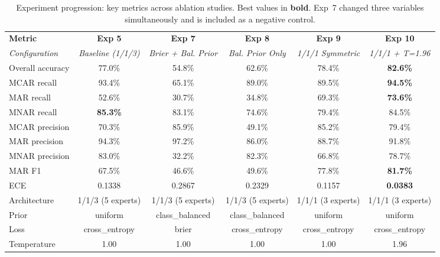 \begin{table}[htbp]
\centering
\caption{Experiment progression: key metrics across ablation studies. Best values in \textbf{bold}. Exp~7 changed three variables simultaneously and is included as a negative control.}
\label{tab:experiment-progression}
\small
\begin{tabular}{lccccc}
\toprule
\textbf{Metric} & \textbf{Exp 5} & \textbf{Exp 7} & \textbf{Exp 8} & \textbf{Exp 9} & \textbf{Exp 10} \\
\textit{Configuration} & \textit{Baseline (1/1/3)} & \textit{Brier + Bal. Prior} & \textit{Bal. Prior Only} & \textit{1/1/1 Symmetric} & \textit{1/1/1 + T=1.96} \\
\midrule
Overall accuracy & 77.0\% & 54.8\% & 62.6\% & 78.4\% & \textbf{82.6\%} \\
MCAR recall & 93.4\% & 65.1\% & 89.0\% & 89.5\% & \textbf{94.5\%} \\
MAR recall & 52.6\% & 30.7\% & 34.8\% & 69.3\% & \textbf{73.6\%} \\
MNAR recall & \textbf{85.3\%} & 83.1\% & 74.6\% & 79.4\% & 84.5\% \\
MCAR precision & 70.3\% & 85.9\% & 49.1\% & 85.2\% & 79.4\% \\
MAR precision & 94.3\% & 97.2\% & 86.0\% & 88.7\% & 91.8\% \\
MNAR precision & 83.0\% & 32.2\% & 82.3\% & 66.8\% & 78.7\% \\
MAR F1 & 67.5\% & 46.6\% & 49.6\% & 77.8\% & \textbf{81.7\%} \\
ECE & 0.1338 & 0.2867 & 0.2329 & 0.1157 & \textbf{0.0383} \\
\midrule
Architecture & 1/1/3 (5 experts) & 1/1/3 (5 experts) & 1/1/3 (5 experts) & 1/1/1 (3 experts) & 1/1/1 (3 experts) \\
Prior & uniform & class_balanced & class_balanced & uniform & uniform \\
Loss & cross_entropy & brier & cross_entropy & cross_entropy & cross_entropy \\
Temperature & 1.00 & 1.00 & 1.00 & 1.00 & 1.96 \\
\bottomrule
\end{tabular}
\end{table}